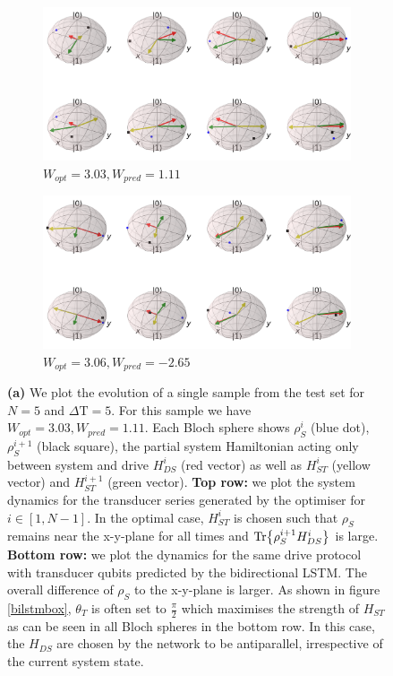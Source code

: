 \begin{figure}
	\centering
	\begin{subfigure}{0.85\textwidth}
		\centering
		\includegraphics[width=\textwidth]{img/bloch_10553_crop}
		\caption{$W_{opt} = 3.03, W_{pred} = 1.11$}
		\label{bloch_10553}
	\end{subfigure}
	\begin{subfigure}{0.85\textwidth}
		\centering
		\includegraphics[width=\textwidth]{img/bloch_worst_crop}
		\caption{$W_{opt} = 3.06, W_{pred} = -2.65$}
		\label{bloch_worst}
	\end{subfigure}
	\caption{\textbf{(a)} We plot the evolution of a single sample from the test set for $N=5$ and $\Delta \mathrm{T} = 5$. For this sample we have $W_{opt} = 3.03, W_{pred} = 1.11$. Each Bloch sphere shows $\rho_S^i$ (blue dot), $\rho_S^{i+1}$ (black square), the partial system Hamiltonian acting only between system and drive $H_{DS}^i$ (red vector) as well as $H_{ST}^i$ (yellow vector) and $H_{ST}^{i+1}$ (green vector). \textbf{Top row:} we plot the system dynamics for the transducer series generated by the optimiser for $i \in [1, N - 1]$. In the optimal case, $H_{ST}^i$ is chosen such that $\rho_S$ remains near the x-y-plane for all times and $\Tr{\rho_S^{i+1} H_{DS}^i}$ is large. \textbf{Bottom row:} we plot the dynamics for the same drive protocol with transducer qubits predicted by the bidirectional LSTM. The overall difference of $\rho_S$ to the x-y-plane is larger. As shown in figure \ref{bilstmbox}, $\theta_T$ is often set to $\frac{\pi}{2}$ which maximises the strength of $H_{ST}$ as can be seen in all Bloch spheres in the bottom row. In this case, the $H_{DS}$ are chosen by the network to be antiparallel, irrespective of the current system state.
}
\end{figure}
